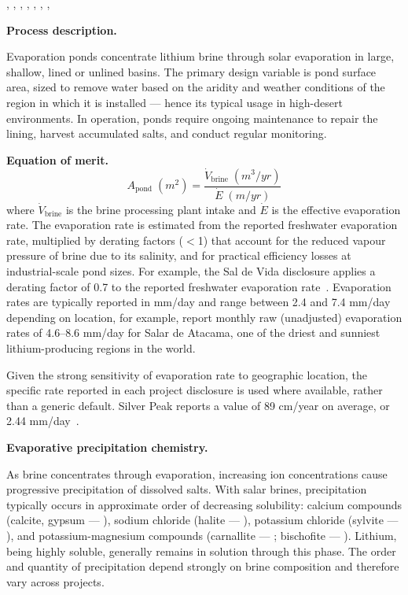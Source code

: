 \citet{heEnvironmentalLifeCycle2025}, \citet{flemingLongrunAvailabilityMineral2024}, \citet{stampEnvironmentalImpactsTransition2012}, \citet{srkconsultingSECTechnicalReport2023a}, \citet{becerraTechnicalReportSummary2024}, \citet{srkconsultingSECTechnicalReport2022}, \citet{montgomeryassociatesconsultoreslimitadaSECTechnicalReport2023}, \citet{brookerSECTechnicalReport2023}

\medskip
\noindent\textbf{Process description.}\quad

Evaporation ponds concentrate lithium brine through solar evaporation in large, shallow, lined or unlined basins. The primary design variable is pond surface area, sized to remove water based on the aridity and weather conditions of the region in which it is installed --- hence its typical usage in high-desert environments. In operation, ponds require ongoing maintenance to repair the lining, harvest accumulated salts, and conduct regular monitoring.

\medskip
\noindent\textbf{Equation of merit.}\quad
\[
  A_\text{pond}\;(\si{m^2}) = \frac{\dot{V}_\text{brine}\;(\si{m^3/yr})}{\dot{E}\;(\si{m/yr})}
\]
where $\dot{V}_\text{brine}$ is the brine processing plant intake and $\dot{E}$ is the effective evaporation rate. The evaporation rate is estimated from the reported freshwater evaporation rate, multiplied by derating factors ($<$1) that account for the reduced vapour pressure of brine due to its salinity, and for practical efficiency losses at industrial-scale pond sizes. For example, the Sal de Vida disclosure applies a derating factor of 0.7 to the reported freshwater evaporation rate~\cite{montgomeryassociatesconsultoreslimitadaSECTechnicalReport2023}. Evaporation rates are typically reported in mm/day and range between 2.4 and 7.4 mm/day depending on location, for example, \citet{heEnvironmentalLifeCycle2025} report monthly raw (unadjusted) evaporation rates of 4.6--8.6 mm/day for Salar de Atacama, one of the driest and sunniest lithium-producing regions in the world.

Given the strong sensitivity of evaporation rate to geographic location, the specific rate reported in each project disclosure is used where available, rather than a generic default. Silver Peak reports a value of 89 cm/year on average, or 2.44 mm/day~\cite{srkconsultingSECTechnicalReport2023a}. 

\medskip
\noindent\textbf{Evaporative precipitation chemistry.}\quad

As brine concentrates through evaporation, increasing ion concentrations cause progressive precipitation of dissolved salts. With salar brines, precipitation typically occurs in approximate order of decreasing solubility: calcium compounds (calcite, gypsum --- ), sodium chloride (halite --- ), potassium chloride (sylvite --- ), and potassium-magnesium compounds (carnallite --- ; bischofite --- ). Lithium, being highly soluble, generally remains in solution through this phase. The order and quantity of precipitation depend strongly on brine composition and therefore vary across projects.

